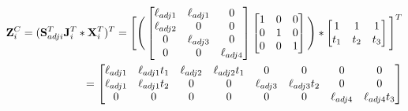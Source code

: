 \documentclass[12pt]{article}
\begin{document}
\begin{align}
{\mathbf Z}^{C}_{i} = ({\mathbf S}^{T}_{adji}{\mathbf J}^{T}_{i} \ast {\mathbf X}^{T}_{i})^{T} =
\Bigg[
\Bigg(
\begin{bmatrix}
\ell_{adj1} & \ell_{adj1}  & 0 \\
\ell_{adj2} &  0  & 0 \\
0  &  \ell_{adj3} & 0 \\
0 & 0 &  \ell_{adj4} 
\end{bmatrix}
\begin{bmatrix}
1 & 0  & 0 \\
0 & 1  & 0 \\
0 & 0  & 1  
\end{bmatrix}
\Bigg)
\ast
\begin{bmatrix}
1   & 1   & 1  \\ 
t_1 & t_2 & t_3
\end{bmatrix} 
\Bigg]^T
\\
= \begin{bmatrix}
\ell_{adj1} & \ell_{adj1}t_1 & \ell_{adj2} & \ell_{adj2}t_1 & 0 & 0 & 0 & 0 \\
\ell_{adj1} & \ell_{adj1}t_2 & 0 & 0 & \ell_{adj3} & \ell_{adj3}t_2 & 0 & 0 \\
0 & 0 & 0 & 0 & 0 & 0 & \ell_{adj4} & \ell_{adj4}t_3
\end{bmatrix}
\end{align}


% 
% 
\end{document}
